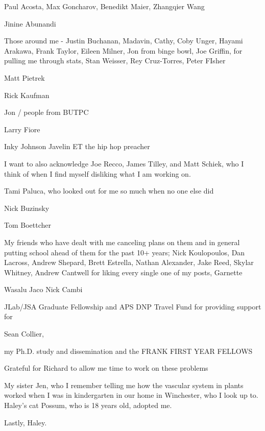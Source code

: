 Paul Acosta, Max Goncharov, Benedikt Maier, Zhangqier Wang


Jinine Abunandi

Those around me - Justin Buchanan, Madavin, Cathy, Coby Unger, Hayami Arakawa, Frank Taylor, Eileen Milner, Jon from binge bowl, Joe Griffin, for pulling me through stats, Stan Weisser, Rey Cruz-Torres, Peter FIsher

Matt Pietrek

Rick Kaufman

Jon / people from BUTPC

Larry Fiore

Inky Johnson
Javelin
ET the hip hop preacher

I want to also acknowledge Joe Recco, James Tilley, and Matt  Schiek, who I think of when I find myself disliking what I am working on. 

Tami Paluca, who looked out for me so much when no one else did

Nick Buzinsky

Tom Boettcher


My friends who have dealt with me canceling plans on them and in general putting school ahead of them for the past 10+ years; Nick Koulopoulos, Dan Lacross, Andrew Shepard, Brett Estrella, Nathan Alexander, Jake Reed, Skylar Whitney, Andrew Cantwell for liking every single one of my posts, Garnette


Wasalu Jaco
Nick Cambi

JLab/JSA Graduate Fellowship and APS DNP Travel Fund for providing support for

Sean Collier,


my Ph.D. study and dissemination and the FRANK FIRST YEAR FELLOWS


Grateful for Richard to allow me time to work on these problems

My sister Jen, who I remember telling me how the vascular system in plants worked when I was in kindergarten in our home in Winchester, who I look up to. Haley's cat Possum, who is 18 years old, adopted me. 

Lastly, Haley. 

\fi